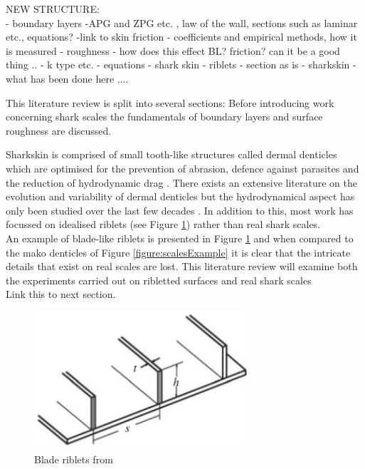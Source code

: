 \documentclass[12pt,oneside,a4paper]{article}
\begin{document}
NEW STRUCTURE:\\
-	boundary layers
			-APG and ZPG etc. , law of the wall, sections such as laminar etc., equations?
			-link to skin friction - coefficients and empirical methods, how it is measured
-	roughness
			-	how does this effect BL? friction? can it be a good thing ..
			-	k type etc. 
			-	equations
-	shark skin
	-	riblets - section as is
	-	sharkskin	-	what has been done here ....

\vspace{2cm}


This literature review is split into several sections: Before introducing work concerning shark scales the fundamentals of boundary layers and surface roughness are discussed.



Sharkskin is comprised of small tooth-like structures called dermal denticles which are optimised for the prevention of abrasion, defence against parasites and the reduction of hydrodynamic drag \citep{fletcher2014}. There exists an extensive literature on the evolution and variability of dermal denticles \citep{reif1985} but the hydrodynamical aspect has only been studied over the last few decades \citep{dean2010}. In addition to this, most work has focussed on idealised riblets (see Figure \ref{figure:literatureReview:bladeRiblets}) rather than real shark scales.
\\
 An example of blade-like riblets is presented in Figure \ref{figure:literatureReview:bladeRiblets} and when compared to the mako denticles of Figure \ref{figure:scalesExample} it is clear that the intricate details that exist on real scales are lost. This literature review will examine both the experiments carried out on ribletted surfaces and real shark scales 
\\
Link this to next section.
%
\begin{figure}[!b]
\centering
\includegraphics[width=8cm]{images/bladeRiblets.png}
\caption{Blade riblets from \cite{dean2010}}
\label{figure:literatureReview:bladeRiblets}
\end{figure}  
%
\end{document}
